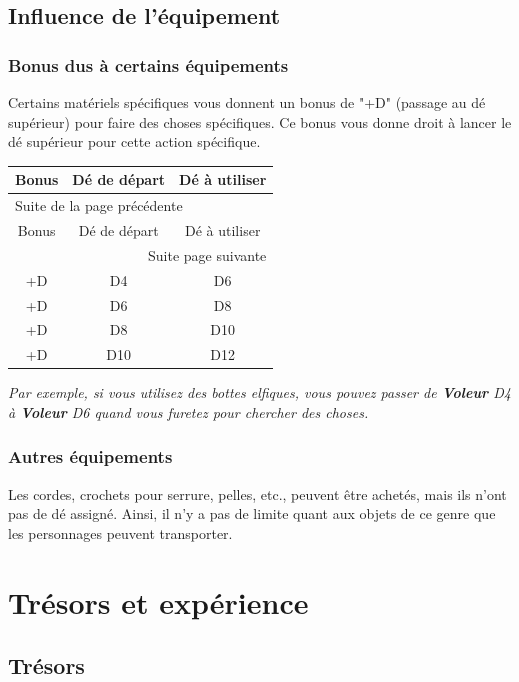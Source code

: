 \documentclass[a4paper, 11pt, twoside]{article}
\begin{document}
\subsection{Influence de l'équipement}
\label{sec:org4f65b49}
\subsubsection{Bonus dus à certains équipements}
\label{sec:orgf9148ee}

Certains matériels spécifiques vous donnent un bonus de "+D" (passage au dé supérieur) pour faire des choses spécifiques. Ce bonus vous donne droit à lancer le dé supérieur pour cette action spécifique.

\begin{longtable}{c|c|c}
Bonus & Dé de départ & Dé à utiliser\\
\hline
\endfirsthead
\multicolumn{3}{l}{Suite de la page précédente} \\
\hline

Bonus & Dé de départ & Dé à utiliser \\

\hline
\endhead
\hline\multicolumn{3}{r}{Suite page suivante} \\
\endfoot
\endlastfoot
\hline
+D & D4 & D6\\
+D & D6 & D8\\
+D & D8 & D10\\
+D & D10 & D12\\
\end{longtable}

\emph{Par exemple, si vous utilisez des bottes elfiques, vous pouvez passer de \textbf{Voleur} D4 à \textbf{Voleur} D6 quand vous furetez pour chercher des choses.}

\subsubsection{Autres équipements}
\label{sec:orge424c27}

Les cordes, crochets pour serrure, pelles, etc., peuvent être achetés, mais ils n'ont pas de dé assigné. Ainsi, il n'y a pas de limite quant aux objets de ce genre que les personnages peuvent transporter.

\section{Trésors et expérience}
\label{sec:org8dc5ebc}
\subsection{Trésors}
\label{sec:org41a8481}
\end{document}
